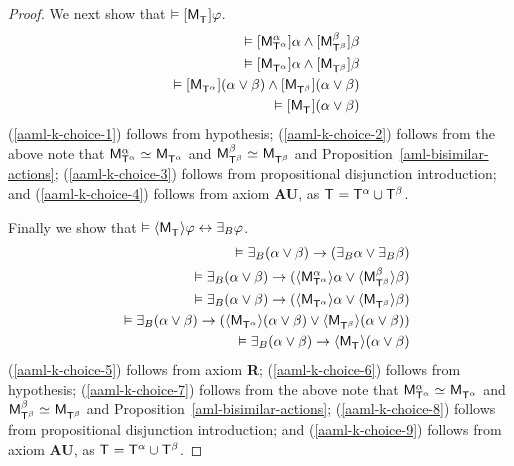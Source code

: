 \begin{proof}
We next show that $\entails \actionA{\aPModel{\aStatesT}} \phi$.
\begin{eqnarray}
    &&\entails \actionA{\aPModel[\alpha]{\aStatesT[\alpha]}} \alpha \land \actionA{\aPModel[\beta]{\aStatesT[\beta]}} \beta \label{aaml-k-choice-1}\\
    &&\entails \actionA{\aPModel{\aStatesT[\alpha]}} \alpha \land \actionA{\aPModel{\aStatesT[\beta]}} \beta \label{aaml-k-choice-2}\\
    &&\entails \actionA{\aPModel{\aStatesT[\alpha]}} (\alpha \lor \beta) \land \actionA{\aPModel{\aStatesT[\beta]}} (\alpha \lor \beta) \label{aaml-k-choice-3}\\
    &&\entails \actionA{\aPModel{\aStatesT}} (\alpha \lor \beta) \label{aaml-k-choice-4}
\end{eqnarray}
(\ref{aaml-k-choice-1}) follows from hypothesis;
(\ref{aaml-k-choice-2}) follows from the above note that $\aPModel[\alpha]{\aStatesT[\alpha]} \bisimilar \aPModel{\aStatesT[\alpha]}$ and $\aPModel[\beta]{\aStatesT[\beta]} \bisimilar \aPModel{\aStatesT[\beta]}$ and Proposition~\ref{aml-bisimilar-actions};
(\ref{aaml-k-choice-3}) follows from propositional disjunction introduction; and
(\ref{aaml-k-choice-4}) follows from \axiomRamlK{} axiom {\bf AU}, as $\aStatesT = \aStatesT[\alpha] \cup \aStatesT[\beta]$.

Finally we show that $\entails \actionE{\aPModel{\aStatesT}} \phi \iff \someactsBs \phi$.
\begin{eqnarray}
    &&\entails \someactsBs (\alpha \lor \beta) \implies (\someactsBs \alpha \lor \someactsBs \beta) \label{aaml-k-choice-5}\\
    &&\entails \someactsBs (\alpha \lor \beta) \implies (\actionE{\aPModel[\alpha]{\aStatesT[\alpha]}} \alpha \lor \actionE{\aPModel[\beta]{\aStatesT[\beta]}} \beta) \label{aaml-k-choice-6}\\
    &&\entails \someactsBs (\alpha \lor \beta) \implies (\actionE{\aPModel{\aStatesT[\alpha]}} \alpha \lor \actionE{\aPModel{\aStatesT[\beta]}} \beta) \label{aaml-k-choice-7}\\
    &&\entails \someactsBs (\alpha \lor \beta) \implies (\actionE{\aPModel{\aStatesT[\alpha]}} (\alpha \lor \beta) \lor \actionE{\aPModel{\aStatesT[\beta]}} (\alpha \lor \beta)) \label{aaml-k-choice-8}\\
    &&\entails \someactsBs (\alpha \lor \beta) \implies \actionE{\aPModel{\aStatesT}} (\alpha \lor \beta) \label{aaml-k-choice-9}
\end{eqnarray}
(\ref{aaml-k-choice-5}) follows from \axiomRamlK{} axiom {\bf R};
(\ref{aaml-k-choice-6}) follows from hypothesis;
(\ref{aaml-k-choice-7}) follows from the above note that $\aPModel[\alpha]{\aStatesT[\alpha]} \bisimilar \aPModel{\aStatesT[\alpha]}$ and $\aPModel[\beta]{\aStatesT[\beta]} \bisimilar \aPModel{\aStatesT[\beta]}$ and Proposition~\ref{aml-bisimilar-actions};
(\ref{aaml-k-choice-8}) follows from propositional disjunction introduction; and
(\ref{aaml-k-choice-9}) follows from \axiomRamlK{} axiom {\bf AU}, as $\aStatesT = \aStatesT[\alpha] \cup \aStatesT[\beta]$.


\end{proof}
